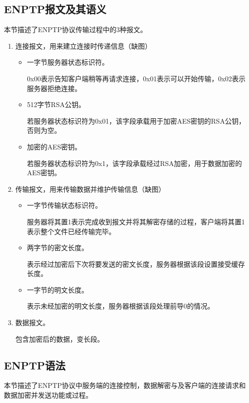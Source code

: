 \subsection{ENPTP报文及其语义}
本节描述了ENPTP协议传输过程中的3种报文。
\begin{enumerate}

\item 连接报文，用来建立连接时传递信息（缺图）
\begin{itemize}
\item 一字节服务器状态标识符。

0x00表示告知客户端稍等再请求连接，0x01表示可以开始传输，0x02表示服务器拒绝连接。
\item 512字节RSA公钥。

若服务器状态标识符为0x01，该字段承载用于加密AES密钥的RSA公钥，否则为空。
\item 加密的AES密钥。

若服务器状态标识符为0x1，该字段承载经过RSA加密，用于数据加密的AES密钥。
\end{itemize}

\item 传输报文，用来传输数据并维护传输信息（缺图）
\begin{itemize}
\item 一字节传输状态标识符。

服务器将其置1表示完成收到报文并将其解密存储的过程，客户端将其置1表示整个文件已经传输完毕。
\item 两字节的密文长度。

表示经过加密后下次将要发送的密文长度，服务器根据该段设置接受缓存长度。
\item 一字节的明文长度。

表示未经加密的明文长度，服务器根据该段处理前导0的情况。
\end{itemize}
\item 数据报文。

包含加密后的数据，变长段。
\end{enumerate}

\subsection{ENPTP语法}
本节描述了ENPTP协议中服务端的连接控制，数据解密与及客户端的连接请求和数据加密并发送功能或过程。

